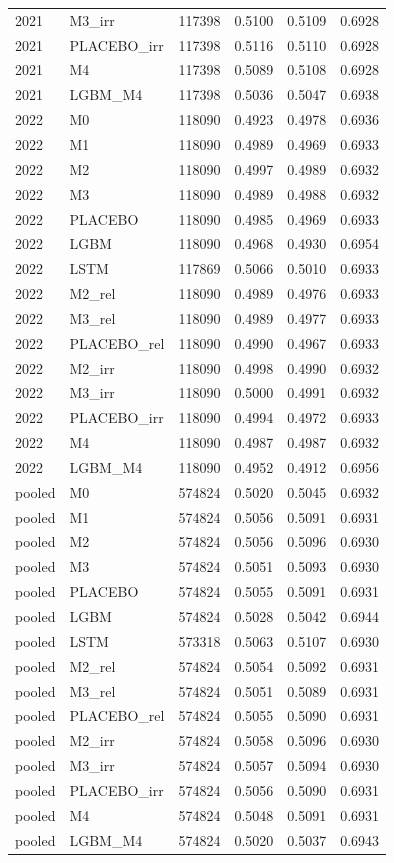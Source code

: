 \begin{tabular}{llrrrr}
2021 & M3\_irr & 117398 & 0.5100 & 0.5109 & 0.6928 \\
2021 & PLACEBO\_irr & 117398 & 0.5116 & 0.5110 & 0.6928 \\
2021 & M4 & 117398 & 0.5089 & 0.5108 & 0.6928 \\
2021 & LGBM\_M4 & 117398 & 0.5036 & 0.5047 & 0.6938 \\
2022 & M0 & 118090 & 0.4923 & 0.4978 & 0.6936 \\
2022 & M1 & 118090 & 0.4989 & 0.4969 & 0.6933 \\
2022 & M2 & 118090 & 0.4997 & 0.4989 & 0.6932 \\
2022 & M3 & 118090 & 0.4989 & 0.4988 & 0.6932 \\
2022 & PLACEBO & 118090 & 0.4985 & 0.4969 & 0.6933 \\
2022 & LGBM & 118090 & 0.4968 & 0.4930 & 0.6954 \\
2022 & LSTM & 117869 & 0.5066 & 0.5010 & 0.6933 \\
2022 & M2\_rel & 118090 & 0.4989 & 0.4976 & 0.6933 \\
2022 & M3\_rel & 118090 & 0.4989 & 0.4977 & 0.6933 \\
2022 & PLACEBO\_rel & 118090 & 0.4990 & 0.4967 & 0.6933 \\
2022 & M2\_irr & 118090 & 0.4998 & 0.4990 & 0.6932 \\
2022 & M3\_irr & 118090 & 0.5000 & 0.4991 & 0.6932 \\
2022 & PLACEBO\_irr & 118090 & 0.4994 & 0.4972 & 0.6933 \\
2022 & M4 & 118090 & 0.4987 & 0.4987 & 0.6932 \\
2022 & LGBM\_M4 & 118090 & 0.4952 & 0.4912 & 0.6956 \\
pooled & M0 & 574824 & 0.5020 & 0.5045 & 0.6932 \\
pooled & M1 & 574824 & 0.5056 & 0.5091 & 0.6931 \\
pooled & M2 & 574824 & 0.5056 & 0.5096 & 0.6930 \\
pooled & M3 & 574824 & 0.5051 & 0.5093 & 0.6930 \\
pooled & PLACEBO & 574824 & 0.5055 & 0.5091 & 0.6931 \\
pooled & LGBM & 574824 & 0.5028 & 0.5042 & 0.6944 \\
pooled & LSTM & 573318 & 0.5063 & 0.5107 & 0.6930 \\
pooled & M2\_rel & 574824 & 0.5054 & 0.5092 & 0.6931 \\
pooled & M3\_rel & 574824 & 0.5051 & 0.5089 & 0.6931 \\
pooled & PLACEBO\_rel & 574824 & 0.5055 & 0.5090 & 0.6931 \\
pooled & M2\_irr & 574824 & 0.5058 & 0.5096 & 0.6930 \\
pooled & M3\_irr & 574824 & 0.5057 & 0.5094 & 0.6930 \\
pooled & PLACEBO\_irr & 574824 & 0.5056 & 0.5090 & 0.6931 \\
pooled & M4 & 574824 & 0.5048 & 0.5091 & 0.6931 \\
pooled & LGBM\_M4 & 574824 & 0.5020 & 0.5037 & 0.6943 \\
\bottomrule
\end{tabular}
